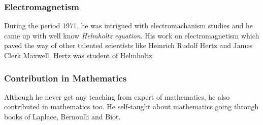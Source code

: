 \documentclass[11pt]{article}
\begin{document}
\subsubsection{Electromagnetism}
During the period 1971, he was intrigued with electromachanism studies and he came up with well know \textit{Helmholtz equation}. His work on electromagnetism which paved the way of other talented scientists like Heinrich Rudolf Hertz and James Clerk Maxwell. Hertz was student of Helmholtz.

\subsubsection{Contribution in Mathematics}
Although he never get any teaching from expert of mathematics, he also contributed in mathematics too. He self-taught about mathematics going through books of Laplace, Bernoulli and Biot.
\end{document}
